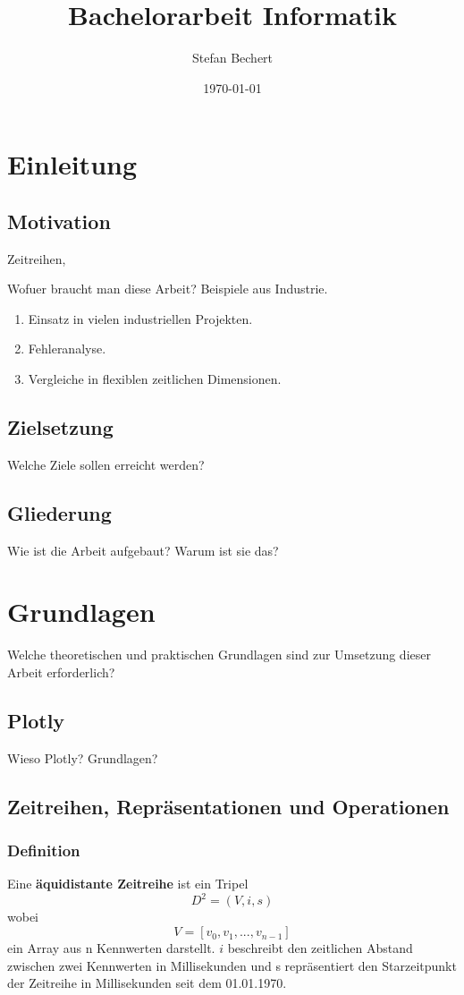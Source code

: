 \documentclass[12pt]{article}
\title{Bachelorarbeit Informatik}
\author{Stefan Bechert}
\date{\today}
\begin{document}
\maketitle
\newpage
\tableofcontents
\newpage

\section{Einleitung}
	\subsection{Motivation}
		Zeitreihen, 
	
		Wofuer braucht man diese Arbeit? Beispiele aus Industrie.
		\begin{enumerate}
			\item{Einsatz in vielen industriellen Projekten.}
			\item{Fehleranalyse.}
			\item{Vergleiche in flexiblen zeitlichen Dimensionen.}
		\end{enumerate}
	\subsection{Zielsetzung}
		Welche Ziele sollen erreicht werden? 
	\subsection{Gliederung}
		Wie ist die Arbeit aufgebaut? Warum ist sie das?
		
\section{Grundlagen}
		Welche theoretischen und praktischen Grundlagen sind zur Umsetzung dieser Arbeit erforderlich?
	\subsection{Plotly}
		Wieso Plotly? Grundlagen?
	\subsection{Zeitreihen, Repräsentationen und Operationen}
		\subsubsection{Definition}
		\label{sec: def}
		Eine \textbf{äquidistante Zeitreihe} ist ein Tripel 
			\begin{equation}
				D^{2} = (V, i, s)
			\end{equation}
		wobei
			\begin{equation}
				V = [v_{0}, v_{1}, ..., v_{n - 1}]
			\end{equation}
		ein Array aus n Kennwerten darstellt.
		$i$ beschreibt den zeitlichen Abstand zwischen zwei Kennwerten in Millisekunden und s repräsentiert den Starzeitpunkt der Zeitreihe in 		Millisekunden seit dem 01.01.1970.
\end{document}

